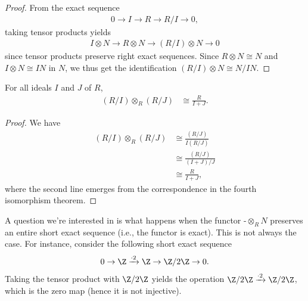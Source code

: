 \documentclass[10pt]{mypackage}
\begin{document}
\begin{proof}
  From the exact sequence
  \begin{align*}
    0\rightarrow I\rightarrow R \rightarrow R/I\rightarrow 0,
  \end{align*}
  taking tensor products yields
  \begin{align*}
    I\otimes N\rightarrow R\otimes N \rightarrow \left( R/I \right)\otimes N\rightarrow 0
  \end{align*}
  since tensor products preserve right exact sequences. Since $R\otimes N\cong N$ and $I\otimes N\cong IN$ in $N$, we thus get the identification $\left( R/I \right)\otimes N\cong N/IN$.
\end{proof}
\begin{corollary}
  For all ideals $I$ and $J$ of $R$,
  \begin{align*}
    \left( R/I \right)\otimes_{R}\left( R/J \right) &\cong \frac{R}{I + J}.
  \end{align*}
\end{corollary}
\begin{proof}
  We have
  \begin{align*}
    \left( R/I \right)\otimes_{R} \left( R/J \right) &\cong \frac{\left( R/J \right)}{I\left( R/J \right)}\\
                                                     &\cong \frac{\left( R/J \right)}{\left( I+J \right)/J}\\
                                                     &\cong \frac{R}{I + J},
  \end{align*}
  where the second line emerges from the correspondence in the fourth isomorphism theorem.
\end{proof}
A question we're interested in is what happens when the functor $\operatorname{-}\otimes_{R}N$ preserves an entire short exact sequence (i.e., the functor is exact). This is not always the case. For instance, consider the following short exact sequence
\begin{align*}
  0 \rightarrow \Z \xrightarrow{\cdot 2} \Z\rightarrow \Z/2\Z\rightarrow 0.
\end{align*}
Taking the tensor product with $\Z/2\Z$ yields the operation $\Z/2\Z\xrightarrow{\cdot 2}\Z/2\Z$, which is the zero map (hence it is not injective).
\end{document}
